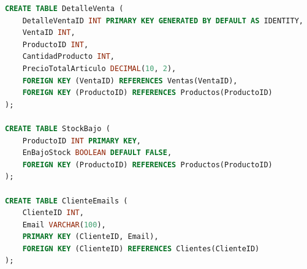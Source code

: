 \documentclass[10pt,openany]{book}
\begin{document}
\begin{lstlisting}[language=SQL]
CREATE TABLE DetalleVenta (
    DetalleVentaID INT PRIMARY KEY GENERATED BY DEFAULT AS IDENTITY,
    VentaID INT,
    ProductoID INT,
    CantidadProducto INT,
    PrecioTotalArticulo DECIMAL(10, 2),
    FOREIGN KEY (VentaID) REFERENCES Ventas(VentaID),
    FOREIGN KEY (ProductoID) REFERENCES Productos(ProductoID)
);

CREATE TABLE StockBajo (
    ProductoID INT PRIMARY KEY,
    EnBajoStock BOOLEAN DEFAULT FALSE,
    FOREIGN KEY (ProductoID) REFERENCES Productos(ProductoID)
);

CREATE TABLE ClienteEmails (
    ClienteID INT,
    Email VARCHAR(100),
    PRIMARY KEY (ClienteID, Email),
    FOREIGN KEY (ClienteID) REFERENCES Clientes(ClienteID)
);
\end{lstlisting}




\end{document}
